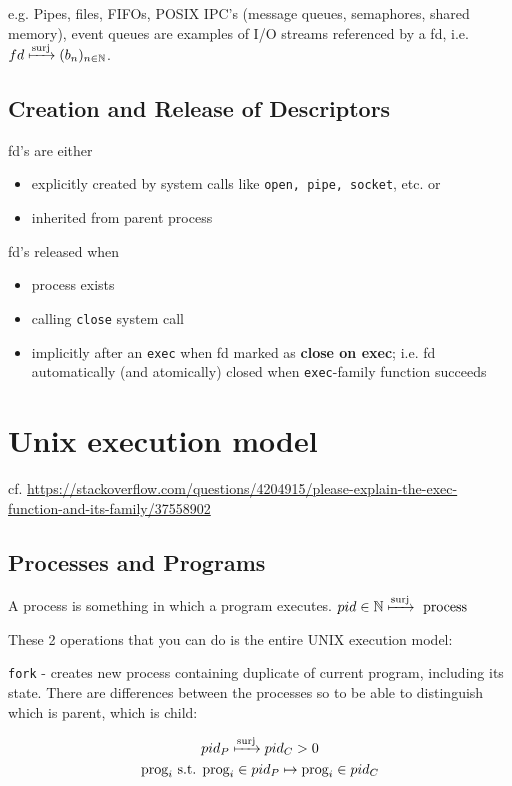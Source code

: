 \documentclass[10pt]{amsart}
\begin{document}
e.g. Pipes, files, FIFOs, POSIX IPC's (message queues, semaphores, shared memory), event queues are examples of I/O streams referenced by a fd, i.e. $fd \xmapsto{\text{surj}} (b_n)_{n \in \mathbb{N}}$.

\subsection{Creation and Release of Descriptors}

fd's are either 
\begin{itemize}
	\item explicitly created by system calls like \texttt{open, pipe, socket}, etc. or 
	\item inherited from parent process
\end{itemize}

fd's released when
\begin{itemize}
	\item process exists
	\item calling \texttt{close} system call
	\item implicitly after an \texttt{exec} when fd marked as \textbf{close on exec}; i.e. fd automatically (and atomically) closed when \texttt{exec}-family function succeeds
\end{itemize}

\section{Unix execution model}

cf. \url{https://stackoverflow.com/questions/4204915/please-explain-the-exec-function-and-its-family/37558902}

\subsection{Processes and Programs}

A process is something in which a program executes. $pid \in \mathbb{N} \xmapsto{\text{surj}} \text{ process }$

These 2 operations that you can do is the entire UNIX execution model:

\texttt{fork} - creates new process containing duplicate of current program, including its state. There are differences between the processes so to be able to distinguish which is parent, which is child:

\[
\begin{gathered}
pid_P \xmapsto{\text{surj}} pid_C > 0 \\
\text{prog}_i \text{ s.t. } \text{prog}_i \in pid_P \mapsto \text{prog}_i \in pid_C 
\end{gathered}
\]
\end{document}
